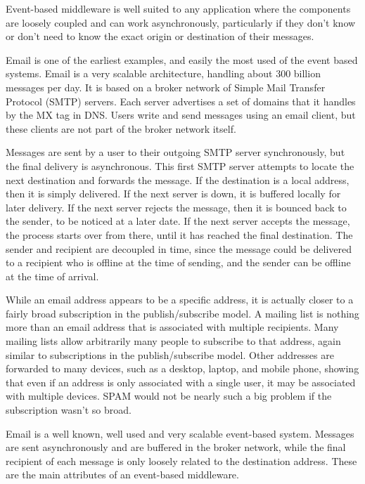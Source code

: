 \documentclass{acm_proc_article-sp}
\begin{document}
Event-based middleware is well suited to any application where the components are loosely coupled and can work asynchronously, particularly if they don't know or don't need to know the exact origin or destination of their messages.

Email is one of the earliest examples, and easily the most used of the event based systems. Email is a very scalable architecture, handling about 300 billion messages per day. It is based on a broker network of Simple Mail Transfer Protocol (SMTP) servers. Each server advertises a set of domains that it handles by the MX tag in DNS. Users write and send messages using an email client, but these clients are not part of the broker network itself.

Messages are sent by a user to their outgoing SMTP server synchronously, but the final delivery is asynchronous. This first SMTP server attempts to locate the next destination and forwards the message. If the destination is a local address, then it is simply delivered. If the next server is down, it is buffered locally for later delivery. If the next server rejects the message, then it is bounced back to the sender, to be noticed at a later date. If the next server accepts the message, the process starts over from there, until it has reached the final destination. The sender and recipient are decoupled in time, since the message could be delivered to a recipient who is offline at the time of sending, and the sender can be offline at the time of arrival.

While an email address appears to be a specific address, it is actually closer to a fairly broad subscription in the publish/subscribe model. A mailing list is nothing more than an email address that is associated with multiple recipients. Many mailing lists allow arbitrarily many people to subscribe to that address, again similar to subscriptions in the publish/subscribe model. Other addresses are forwarded to many devices, such as a desktop, laptop, and mobile phone, showing that even if an address is only associated with a single user, it may be associated with multiple devices. SPAM would not be nearly such a big problem if the subscription wasn't so broad.

Email is a well known, well used and very scalable event-based system. Messages are sent asynchronously and are buffered in the broker network, while the final recipient of each message is only loosely related to the destination address. These are the main attributes of an event-based middleware.
\end{document}
